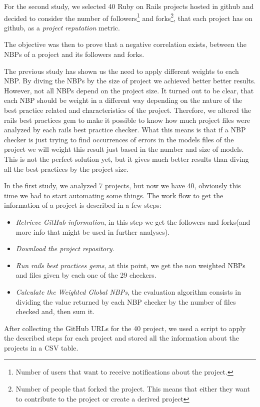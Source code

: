 For the second study, we selected 40 Ruby on Rails projects hosted in github and
decided to consider the number of 
\textsf{followers}\footnote{Number of users that want to receive notifications about the project.} and
\textsf{forks}\footnote{Number of people that forked the project. This means that either they want to contribute to the project or create a derived project}, 
that each project has on github, 
as a \emph{project reputation} metric. 

The objective was then to prove that a negative correlation exists, between the NBPs of a project and its followers and forks. 

The previous study has shown us the need to apply different weights to each NBP. 
By diving the NBPs by the size of project we achieved better better results.
However, not all NBPs depend on the project size.
It turned out to be clear, that each NBP should be weight in a different way depending
on the nature of the best practice related and characteristics of the project.
Therefore, we altered the rails best practices gem to make it possible to know how much project files were analyzed 
by each rails best practice checker.
What this means is that if a NBP checker is just trying to find occurrences of errors in the models files of the project
we will weight this result just based in the number and size of models.
This is not the perfect solution yet, but it gives much better results than diving all the best practices by the project size.

In the first study, we analyzed 7 projects, but now we have 40, obviously this time we had to start automating some things.
The work flow to get the information of a project is described in a few steps:
\begin{itemize}
\item \emph{Retrieve GitHub information}, in this step we get the followers and forks(and more info that might be used in further analyses).
\item \emph{Download the project repository}.
\item \emph{Run rails best practices gems}, at this point, we get the non weighted NBPs and files given by each one of the 29 checkers.
\item \emph{Calculate the Weighted Global NBPs}, the evaluation algorithm consists in dividing the value returned by each NBP checker  by the number of files checked and, then sum it.
\end{itemize}

After collecting the GitHub URLs for the 40 project, we used a script to apply the described steps for each project
and stored all the information about the projects in a CSV table.


